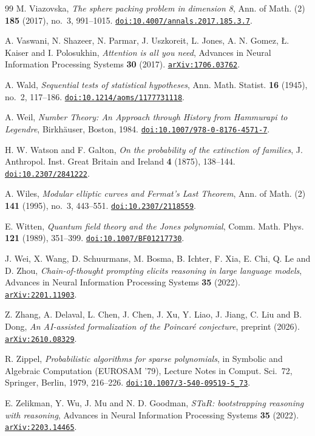 \begin{thebibliography}{99}
M. Viazovska,
\emph{The sphere packing problem in dimension 8},
Ann. of Math. (2) \textbf{185} (2017), no.~3, 991--1015.
\href{https://doi.org/10.4007/annals.2017.185.3.7}{\nolinkurl{doi:10.4007/annals.2017.185.3.7}}.

A. Vaswani, N. Shazeer, N. Parmar, J. Uszkoreit, L. Jones, A. N. Gomez, \L{}. Kaiser and I. Polosukhin,
\emph{Attention is all you need},
Advances in Neural Information Processing Systems \textbf{30} (2017).
\href{https://arxiv.org/abs/1706.03762}{\nolinkurl{arXiv:1706.03762}}.

A. Wald,
\emph{Sequential tests of statistical hypotheses},
Ann. Math. Statist. \textbf{16} (1945), no.~2, 117--186.
\href{https://doi.org/10.1214/aoms/1177731118}{\nolinkurl{doi:10.1214/aoms/1177731118}}.

A. Weil,
\emph{Number Theory: An Approach through History from Hammurapi to Legendre},
Birkh\"auser, Boston, 1984.
\href{https://doi.org/10.1007/978-0-8176-4571-7}{\nolinkurl{doi:10.1007/978-0-8176-4571-7}}.

H. W. Watson and F. Galton,
\emph{On the probability of the extinction of families},
J. Anthropol. Inst. Great Britain and Ireland \textbf{4} (1875), 138--144.
\href{https://doi.org/10.2307/2841222}{\nolinkurl{doi:10.2307/2841222}}.

A. Wiles,
\emph{Modular elliptic curves and Fermat's Last Theorem},
Ann. of Math. (2) \textbf{141} (1995), no.~3, 443--551.
\href{https://doi.org/10.2307/2118559}{\nolinkurl{doi:10.2307/2118559}}.

E. Witten,
\emph{Quantum field theory and the Jones polynomial},
Comm. Math. Phys. \textbf{121} (1989), 351--399.
\href{https://doi.org/10.1007/BF01217730}{\nolinkurl{doi:10.1007/BF01217730}}.

J. Wei, X. Wang, D. Schuurmans, M. Bosma, B. Ichter, F. Xia, E. Chi, Q. Le and D. Zhou,
\emph{Chain-of-thought prompting elicits reasoning in large language models},
Advances in Neural Information Processing Systems \textbf{35} (2022).
\href{https://arxiv.org/abs/2201.11903}{\nolinkurl{arXiv:2201.11903}}.

Z. Zhang, A. Delaval, L. Chen, J. Chen, J. Xu, Y. Liao, J. Jiang, C. Liu and B. Dong,
\emph{An AI-assisted formalization of the Poincar\'e conjecture},
preprint (2026).
\href{https://arxiv.org/abs/2610.08329}{\nolinkurl{arXiv:2610.08329}}.

R. Zippel,
\emph{Probabilistic algorithms for sparse polynomials},
in Symbolic and Algebraic Computation (EUROSAM '79), Lecture Notes in Comput. Sci.~72, Springer, Berlin, 1979, 216--226.
\href{https://doi.org/10.1007/3-540-09519-5_73}{\nolinkurl{doi:10.1007/3-540-09519-5_73}}.

E. Zelikman, Y. Wu, J. Mu and N. D. Goodman,
\emph{STaR: bootstrapping reasoning with reasoning},
Advances in Neural Information Processing Systems \textbf{35} (2022).
\href{https://arxiv.org/abs/2203.14465}{\nolinkurl{arXiv:2203.14465}}.

\end{thebibliography}
